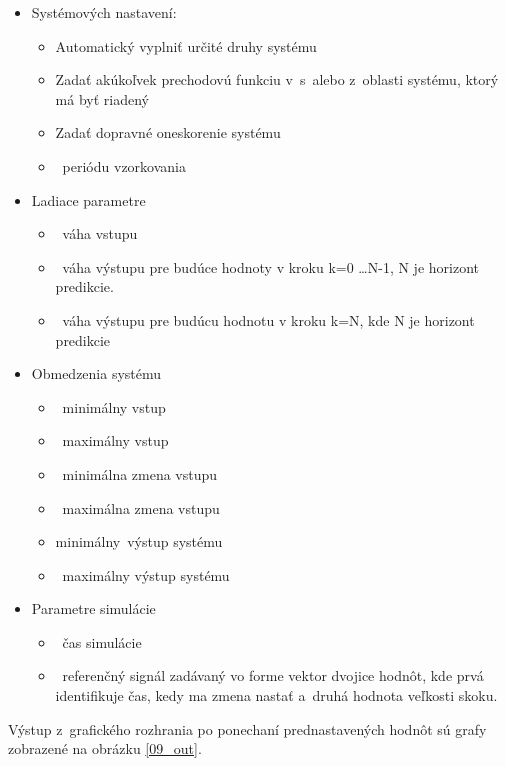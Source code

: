 \begin{itemize}
\item
  Systémových nastavení:

  \begin{itemize}
  \item
    Automatický vyplniť určité druhy systému
  \item
    Zadať akúkoľvek prechodovú funkciu v~s~alebo z~oblasti systému,
    ktorý má byť riadený
  \item
    Zadať dopravné oneskorenie systému
  \item
    ~periódu vzorkovania
  \end{itemize}
\item
  Ladiace parametre

  \begin{itemize}
  \item
    ~váha vstupu
  \item
    ~váha výstupu pre budúce hodnoty v kroku k=0 \dots N-1, N je horizont predikcie.
  \item
    ~váha výstupu pre budúcu hodnotu v kroku k=N, kde N je horizont predikcie
  \end{itemize}
\item
  Obmedzenia systému

  \begin{itemize}
  \item
    ~minimálny vstup
  \item
    ~maximálny vstup
  \item
    ~minimálna zmena vstupu
  \item
    ~maximálna zmena vstupu
  \item
    minimálny~výstup systému
  \item
    ~maximálny výstup systému
  \end{itemize}
\item
  Parametre simulácie

  \begin{itemize}
  \item
    ~čas simulácie
  \item
    ~referenčný signál zadávaný vo forme vektor dvojice hodnôt, kde prvá
    identifikuje čas, kedy ma zmena nastať a~druhá hodnota veľkosti
    skoku.
  \end{itemize}
\end{itemize}

Výstup z~grafického rozhrania po ponechaní prednastavených hodnôt sú grafy zobrazené na obrázku  \ref{09_out}.

